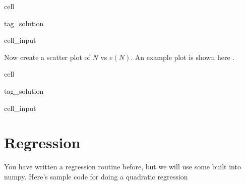 \documentclass[letterpaper,10pt,english]{jupyterBook}
\begin{document}
\begin{sphinxuseclass}{cell}
\begin{sphinxuseclass}{tag_solution}\begin{sphinxVerbatimInput}

\begin{sphinxuseclass}{cell_input}
\begin{sphinxVerbatim}[commandchars=\\\{\}]
\end{sphinxVerbatim}

\end{sphinxuseclass}\end{sphinxVerbatimInput}

\end{sphinxuseclass}
\end{sphinxuseclass}
\sphinxAtStartPar
Now create a scatter plot of \(N\) vs \(e(N)\). An example plot is shown here
.

\begin{sphinxuseclass}{cell}
\begin{sphinxuseclass}{tag_solution}\begin{sphinxVerbatimInput}

\begin{sphinxuseclass}{cell_input}
\begin{sphinxVerbatim}[commandchars=\\\{\}]
\end{sphinxVerbatim}

\end{sphinxuseclass}\end{sphinxVerbatimInput}

\end{sphinxuseclass}
\end{sphinxuseclass}

\section{Regression}
\label{\detokenize{lessons/Gaussian_Elimination-student:regression}}
\sphinxAtStartPar
You have written a regression routine before, but we will use some built into numpy. Here’s sample code for doing a quadratic regression
\end{document}
